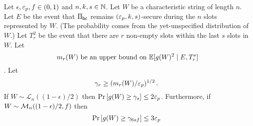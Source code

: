 \begin{lemma}\label{lemma:praos-tail-gamma}
  Let $\epsilon, \mathsf{\varepsilon}_p, f \in (0, 1)$ and $n, k, s \in \mathbb{N}$. 
  Let $W$ be a characteristic string of length $n$.
  Let $E$ be the event that 
  $\Pi_\mathsf{bc}$ remains $(\mathsf{\varepsilon}_p, k, s)$-secure during 
  the $n$ slots represented by $W$. 
  (The probability comes from the yet-unspecified distribution of $W$.)
  Let $T_r^2$ be the event that there are $r$ non-empty slots within the 
  last $s$ slots in $W$.
  Let 
  $$
    \text{ $m_r(W)$ be an upper bound on $\operatorname{\mathbb{E}}[ g(W)^2 \mid E, T_r^s]$}
  $$.
  Let 
  \begin{equation}\label{eq:praos-gamma-general-second-moment}
    \gamma_r \geq (m_r(W)/\mathsf{\varepsilon}_p)^{1/2}
    \,.
  \end{equation}
  If $W \sim \mathcal{L}_n((1-\epsilon)/2)$ 
  then 
  $
      \Pr\left[g(W) \geq \gamma_s\right] \leq 2 \mathsf{\varepsilon}_p
  $.
  Furthermore, 
  if $W \sim \mathcal{M}_n((1 - \epsilon)/2, f)$ 
  then
  \begin{equation}\label{eq:praos-gamma-general-second-moment-empty-slot}
      \Pr\left[g(W) \geq \gamma_{6sf}\right] \leq 3 \mathsf{\varepsilon}_p
  \end{equation}
\end{lemma}
